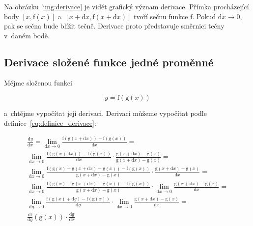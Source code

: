 Na obrázku \ref{img:derivace} je vidět grafický význam derivace. Přímka procházející body \([x, \mathrm{f}(x)]\) a~\([x + \mathrm{d}x, \mathrm{f}(x + \mathrm{d}x)]\) tvoří sečnu funkce \(\mathrm{f}\). Pokud \(\mathrm{d}x \to 0\), pak se sečna bude blížit tečně. Derivace proto představuje směrnici tečny v~daném bodě.

\subsection{Derivace složené funkce jedné proměnné}

Mějme složenou funkci

\begin{equation}
y = \mathrm{f}(\mathrm{g}(x))
\end{equation}

a~chtějme vypočítat její derivaci. Derivaci můžeme vypočítat podle definice~\eqref{eq:definice_derivace}:

\begin{equation}
\label{eq:derivace_slozene_funkce_vypocet}
\begin{split}
\frac{\mathrm{d}y}{\mathrm{d}x} = \lim_{\mathrm{d}x \to 0} \frac{\mathrm{f}(\mathrm{g}(x + \mathrm{d}x)) - \mathrm{f}(\mathrm{g}(x))}{\mathrm{d}x} = \\
\lim_{\mathrm{d}x \to 0} \frac{\mathrm{f}(\mathrm{g}(x + \mathrm{d}x)) - \mathrm{f}(\mathrm{g}(x))}{\mathrm{d}x} \cdot \frac{\mathrm{g}(x + \mathrm{d}x) - \mathrm{g}(x)}{\mathrm{g}(x + \mathrm{d}x) - \mathrm{g}(x)} = \\
\lim_{\mathrm{d}x \to 0} \frac{\mathrm{f}(\mathrm{g}(x) + \mathrm{g}(x + \mathrm{d}x) - \mathrm{g}(x)) - \mathrm{f}(\mathrm{g}(x))}{\mathrm{g}(x + \mathrm{d}x) - \mathrm{g}(x)} \cdot \frac{\mathrm{g}(x + \mathrm{d}x) - \mathrm{g}(x)}{\mathrm{d}x} = \\
\lim_{\mathrm{d}x \to 0} \frac{\mathrm{f}(\mathrm{g}(x) + \mathrm{g}(x + \mathrm{d}x) - \mathrm{g}(x)) - \mathrm{f}(\mathrm{g}(x))}{\mathrm{g}(x + \mathrm{d}x) - \mathrm{g}(x)} \cdot \lim_{\mathrm{d}x \to 0} \frac{\mathrm{g}(x + \mathrm{d}x) - \mathrm{g}(x)}{\mathrm{d}x} = \\
\lim_{\mathrm{d}g \to 0} \frac{\mathrm{f}(\mathrm{g}(x) + \mathrm{d}g) - \mathrm{f}(\mathrm{g}(x))}{\mathrm{d}g} \cdot \lim_{\mathrm{d}x \to 0} \frac{\mathrm{g}(x + \mathrm{d}x) - \mathrm{g}(x)}{\mathrm{d}x} = \\
\frac{\mathrm{df}}{\mathrm{d}g}(\mathrm{g}(x)) \cdot \frac{\mathrm{dg}}{\mathrm{d}x}
\end{split}
\end{equation}

